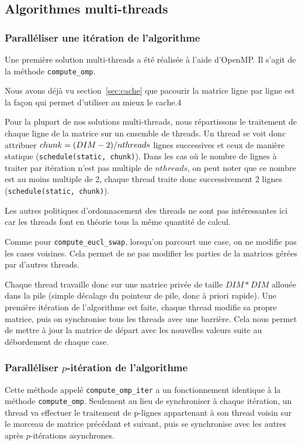 \subsection{Algorithmes multi-threads}

\subsubsection{Paralléliser une itération de l'algorithme}

Une première solution multi-threads a été réalisée à l'aide
d'OpenMP. Il s'agit de la méthode \texttt{compute\_omp}.
\medskip

Nous avons déjà vu section~\ref{sec:cache} que pacourir la matrice
ligne par ligne est la façon qui permet d'utiliser au mieux le cache.4

Pour la plupart de nos solutions multi-threads, nous répartissons le
traitement de chaque ligne de la matrice sur un ensemble de
threads. Un thread se voit donc attribuer $chunk=\-(DIM-2)/nthreads$
lignes successives et ceux de manière statique
(\texttt{schedule(static, \-chunk)}). Dans les cas où le nombre de
lignes à traiter par itération n'est pas multiple de $nthreads$, on
peut noter que ce nombre est au moins multiple de 2, chaque thread
traite donc successivement 2 lignes (\texttt{schedule(static,
  \-chunk)}).

Les autres politiques d'ordonnacement des threads ne sont pas
intéressantes ici car les threads font en théorie tous la même
quantité de calcul.

Comme pour \texttt{compute\_eucl\_swap}, lorsqu'on parcourt une case,
on ne modifie pas les cases voisines. Cela permet de ne pas modifier
les parties de la matrices gérées par d'autres threads.
\medskip

Chaque thread travaille donc sur une matrice privée de taille
$DIM*DIM$ allouée dans la pile (simple décalage du pointeur de pile,
donc à priori rapide). Une première itération de l'algorithme est
faite, chaque thread modifie sa propre matrice, puis on synchronise
tous les threads avec une barrière. Cela nous permet de mettre à jour
la matrice de départ avec les nouvelles valeurs suite au débordement
de chaque case.
\medskip

\subsubsection{Paralléliser $p$-itération de l'algorithme}

Cette méthode appelé \texttt{compute\_omp\_iter} a un fonctionnement
identique à la méthode \texttt{compute\_omp}. Seulement au lieu de
synchroniser à chaque itération, un thread va effectuer le traitement
de p-lignes appartenant à son thread voisin sur le morceau de matrice
précédant et suivant, puis se synchronise avec les autres après
$p$-itérations asynchrones.
\medskip

